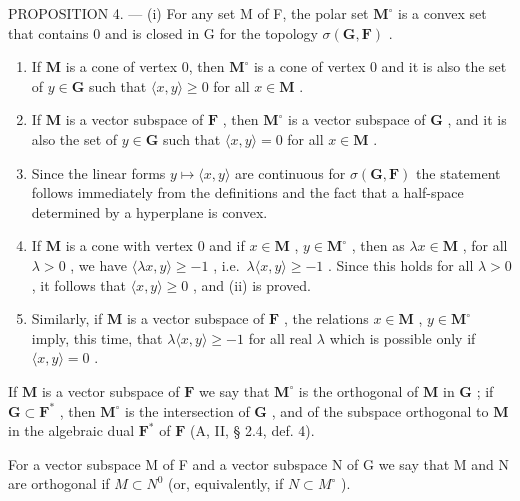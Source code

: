 PROPOSITION 4. --- (i) For any set M of F, the polar set \(\mathbf{M}^{\circ}\) is a convex set that contains 0 and is closed in G for the topology \(\sigma(\mathbf{G},\mathbf{F})\) .

\begin{enumerate}
\def\labelenumi{(\roman{enumi})}
\setcounter{enumi}{1}
\item
  If \(\mathbf{M}\) is a cone of vertex 0, then \(\mathbf{M}^{\circ}\) is a cone of vertex 0 and it is also the set of \(y\in \mathbf{G}\) such that \(\langle x,y\rangle \geqslant 0\) for all \(x\in \mathbf{M}\) .
\item
  If \(\mathbf{M}\) is a vector subspace of \(\mathbf{F}\) , then \(\mathbf{M}^{\circ}\) is a vector subspace of \(\mathbf{G}\) , and it is also the set of \(y \in \mathbf{G}\) such that \(\langle x, y \rangle = 0\) for all \(x \in \mathbf{M}\) .
\item
  Since the linear forms \(y \mapsto \langle x, y \rangle\) are continuous for \(\sigma(\mathbf{G}, \mathbf{F})\) the statement follows immediately from the definitions and the fact that a half-space determined by a hyperplane is convex.
\item
  If \(\mathbf{M}\) is a cone with vertex 0 and if \(x \in \mathbf{M}\) , \(y \in \mathbf{M}^{\circ}\) , then as \(\lambda x \in \mathbf{M}\) , for all \(\lambda > 0\) , we have \(\langle \lambda x, y \rangle \geqslant -1\) , i.e.~\(\lambda \langle x, y \rangle \geqslant -1\) . Since this holds for all \(\lambda > 0\) , it follows that \(\langle x, y \rangle \geqslant 0\) , and (ii) is proved.
\item
  Similarly, if \(\mathbf{M}\) is a vector subspace of \(\mathbf{F}\) , the relations \(x \in \mathbf{M}\) , \(y \in \mathbf{M}^{\circ}\) imply, this time, that \(\lambda \langle x, y \rangle \geqslant -1\) for all real \(\lambda\) which is possible only if \(\langle x, y \rangle = 0\) .
\end{enumerate}

If \(\mathbf{M}\) is a vector subspace of \(\mathbf{F}\) we say that \(\mathbf{M}^{\circ}\) is the orthogonal of \(\mathbf{M}\) in \(\mathbf{G}\) ; if \(\mathbf{G} \subset \mathbf{F}^{*}\) , then \(\mathbf{M}^{\circ}\) is the intersection of \(\mathbf{G}\) , and of the subspace orthogonal to \(\mathbf{M}\) in the algebraic dual \(\mathbf{F}^{*}\) of \(\mathbf{F}\) (A, II, § 2.4, def. 4).

For a vector subspace M of F and a vector subspace N of G we say that M and N are orthogonal if \(M \subset N^{0}\) (or, equivalently, if \(N \subset M^{\circ}\) ).

